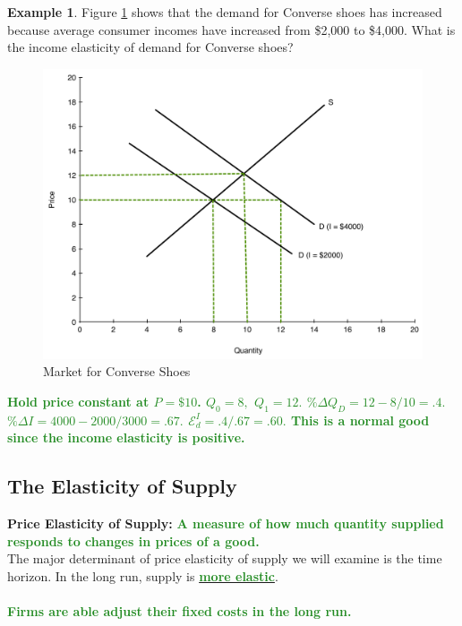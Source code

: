 \documentclass[11pt]{article}\usepackage[]{graphicx}\usepackage[]{color}
\theoremstyle{definition}
\newtheorem{exmp}{Example}[section]
\newcommand{\ddp}[1]{{\textbf{\textcolor{ForestGreen}{#1}}}}
\newcommand{\dd}[1]{{\underline{\textbf{\textcolor{ForestGreen}{#1}}}}}
\newcommand{\defn}[1]{\textbf{#1}}
\begin{document}
\begin{exmp} 
	Figure \ref{fig2} shows that the demand for Converse shoes has increased because average consumer incomes have increased from \$2,000 to \$4,000. What is the income elasticity of demand for Converse shoes?

\begin{figure}[H]
	\centering
	\includegraphics[scale=.33]{hw2_plot1.pdf}
	\caption{Market for Converse Shoes}
	\label{fig2}
\end{figure}
\end{exmp}
\ddp{Hold price constant at $P=\$10$. $Q_0 = 8,$ $Q_1 = 12.$ $\% \Delta Q_D = 12-8/10 = .4.$ $\% \Delta I = 4000-2000/3000 = .67.$ $\mathcal{E}_d^I = .4/.67 = .60.$ This is a normal good since the income elasticity is positive.}
	
	\subsection{The Elasticity of Supply}
	
	\defn{Price Elasticity of Supply:} \ddp{A measure of how much quantity supplied responds to changes in prices of a good.}
	\\
	
	The major determinant of price elasticity of supply we will examine is the time horizon. In the long run, supply is \dd{more elastic}.
	\ddp{\\ \\Firms are able adjust their fixed costs in the long run.}
	

\newpage	
	
\end{document}
